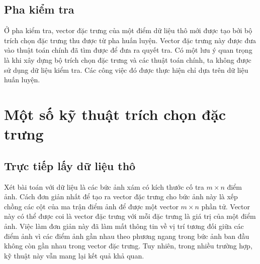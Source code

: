 \subsection{Pha kiểm tra}

Ở pha kiểm tra, vector đặc trưng của một điểm dữ liệu thô mới được tạo bởi bộ trích chọn đặc trưng thu được từ pha huấn luyện. Vector đặc trưng này được đưa
vào thuật toán chính đã tìm được để đưa ra quyết tra. Có một lưu ý quan trọng là khi xây dựng bộ trích chọn đặc trưng và các thuật toán chính, ta không được sử dụng dữ liệu kiểm tra. Các công việc đó được thực hiện chỉ dựa trên dữ liệu huấn luyện.



\section{Một số kỹ thuật trích chọn đặc trưng}

\subsection{Trực tiếp lấy dữ liệu thô}

Xét bài toán với dữ liệu là các bức ảnh xám có kích thước cố tra $m\times n$
điểm ảnh. Cách đơn giản nhất để tạo ra vector đặc trưng cho bức ảnh này là xếp
chồng các cột của ma trận điểm ảnh để được một vector $m\times n$ phần tử.
Vector này có thể được coi là vector đặc trưng với mỗi đặc trưng là giá trị của
một điểm ảnh. Việc làm đơn giản này đã làm mất {thông tin về vị trí tương đối}
giữa các điểm ảnh vì các điểm ảnh gần nhau theo phương ngang trong bức ảnh ban
đầu không còn gần nhau trong vector đặc trưng. Tuy nhiên, trong
nhiều trường hợp, kỹ thuật này vẫn mang lại kết quả khả quan.

